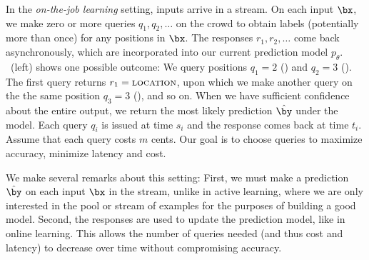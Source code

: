 In the \emph{on-the-job learning} setting, inputs arrive in a stream.
On each input $\bx$,
we make zero or more queries $q_1, q_2, \dots$ on the crowd to obtain labels
(potentially more than once)
for any positions in $\bx$.
The responses $r_1, r_2, \dots$ come back asynchronously,
which are incorporated into our current prediction model $p_\theta$.
~(left) shows one possible outcome:
We query positions $q_1 = 2$ () and $q_2=3$ ().
The first query returns $r_1 = \textsc{location}$,
upon which we make another query on the the same position $q_3 = 3$ (),
and so on.
When we have sufficient confidence about the entire output,
we return the most likely prediction $\hat \by$ under the model.
Each query $q_i$ is issued at time $s_i$ and the response comes back at time $t_i$.
Assume that each query costs $m$ cents.
Our goal is to choose queries to maximize accuracy, minimize latency and cost.

We make several remarks about this setting:
First, we must make a prediction $\hat \by$ on each input $\bx$ in the stream,
unlike in active learning, where we are only interested in the pool or stream of examples
for the purposes of building a good model.
Second, the responses are used to update the prediction model, like in online learning.
This allows the number of queries needed (and thus cost and latency) to decrease over time
without compromising accuracy.

